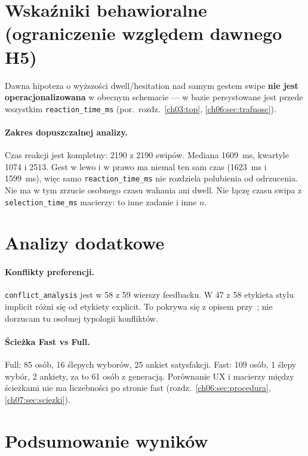\section{Wskaźniki behawioralne (ograniczenie względem dawnego H5)}
\label{ch08:sec:behavioral}

Dawna hipoteza o wyższości dwell/hesitation nad samym gestem swipe \textbf{nie jest operacjonalizowana} w obecnym schemacie --- w bazie persystowane jest przede wszystkim \texttt{reaction\_time\_ms} (por.\ rozdz.~\ref{ch03:top}, \ref{ch06:sec:trafnosc}).

\paragraph{Zakres dopuszczalnej analizy.}
Czas reakcji jest kompletny: 2190 z 2190 swipów. Mediana 1609~ms, kwartyle 1074 i 2513. Gest w lewo i w prawo ma niemal ten sam czas (1623~ms i 1599~ms), więc samo \texttt{reaction\_time\_ms} nie rozdziela polubienia od odrzucenia. Nie ma w tym zrzucie osobnego czasu wahania ani dwell. Nie łączę czasu swipa z \texttt{selection\_time\_ms} macierzy: to inne zadanie i inne $n$.

\section{Analizy dodatkowe}
\label{ch08:sec:dodatkowe}

\paragraph{Konflikty preferencji.}
\texttt{conflict\_analysis} jest w 58 z 59 wierszy feedbacku. W 47 z 58 etykieta stylu implicit różni się od etykiety explicit. To pokrywa się z opisem przy~; nie dorzucam tu osobnej typologii konfliktów.

\paragraph{Ścieżka Fast vs Full.}
Full: 85 osób, 16 ślepych wyborów, 25 ankiet satysfakcji. Fast: 109 osób, 1 ślepy wybór, 2 ankiety, za to 61 osób z generacją. Porównanie UX i macierzy między ścieżkami nie ma liczebności po stronie fast (rozdz.~\ref{ch06:sec:procedura}, \ref{ch07:sec:sciezki}).

\section{Podsumowanie wyników}
\label{ch08:sec:podsumowanie}

